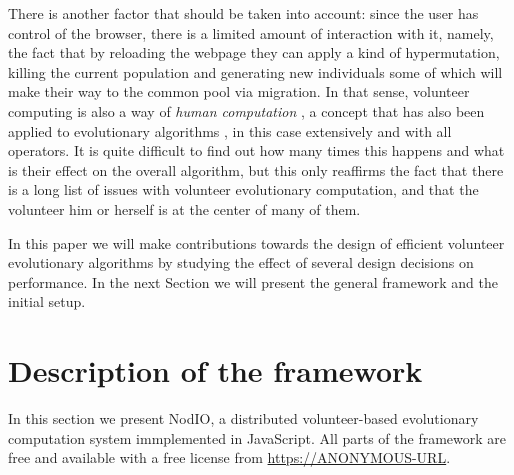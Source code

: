 \documentclass[runningheads,a4paper]{llncs}\usepackage[]{graphicx}\usepackage[]{color}
\begin{document}
There is another factor that should be taken into account: since the
user has control of the browser, there is a limited amount of
interaction with it, namely, the fact that by reloading the webpage they
can apply a kind of hypermutation, killing the current population and
generating new individuals some of which will make their way to the
common pool via migration. In that sense, volunteer computing is also
a way of {\em human computation} \cite{quinn2011human}, a concept that
has also been applied to evolutionary algorithms \cite{972056}, in
this case extensively and with all operators. It is quite difficult to
find out how many times this happens and what is their effect on the
overall algorithm, but this only reaffirms the fact that there is a
long list of issues with volunteer evolutionary computation, and that
the volunteer him or herself is at the center of many of them.

In this paper we will make contributions towards the design of
efficient volunteer evolutionary algorithms by studying the effect of
several design decisions on performance. In the next Section we will
present the general framework and the initial setup.


\section{Description of the framework}
\label{sec:description}

In this section we present {\sf NodIO}, a distributed volunteer-based 
evolutionary computation system immplemented in JavaScript. 
All parts of the framework are free and available
with a free license from \url{https://ANONYMOUS-URL}.
\end{document}
